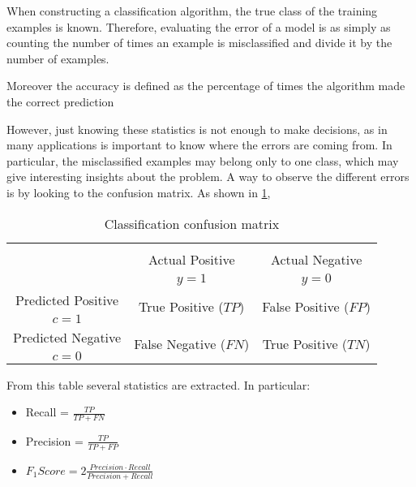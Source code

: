 When constructing a classification algorithm, the true class of the training examples is known. 
Therefore, evaluating the error of a model is as simply as counting the number of times an example 
is misclassified and divide it by the number of examples.


Moreover the accuracy is defined as the percentage of times the algorithm made the correct 
prediction


However, just knowing these statistics is not enough to make decisions, as in many applications is 
important to know where the errors are coming from. In particular, the misclassified examples may 
belong only to one class, which may give interesting insights about the problem.
A way to observe the different errors is by looking to the confusion matrix.
As shown in \tablename{ \ref{tab:ch2:1}}, 

	\begin{table}[!t]
		\centering
		\footnotesize
    \begin{tabular}{c|c|c}
      \multicolumn{3}{c}{}\\
			\multicolumn{1}{c|}{}  & Actual Positive& Actual Negative \\
			\multicolumn{1}{c|}{} & $y=1$& $y=0$ \\
			\hline
			Predicted Positive 		& \multirow{ 2}{*}{True Positive ($TP$)} & \multirow{ 
			2}{*}{False Positive ($FP$)} \\
			$c=1$ & &\\
			\hline
			Predicted Negative  	& \multirow{ 2}{*}{False Negative ($FN$)} & \multirow{ 
			2}{*}{True Positive ($TN$)} \\
			$c=0$ & &\\
		\end{tabular}
		\caption{Classification confusion matrix}
		\label{tab:ch2:1}
  \end{table}  

  	From this table several statistics are extracted. In particular:
	\begin{itemize}
		\item Recall = $\frac{TP}{TP+FN}$
		\item Precision = $\frac{TP}{TP+FP}$
		\item $F_1Score = 2\frac{Precision \cdot Recall}{Precision + Recall}$
	\end{itemize}



